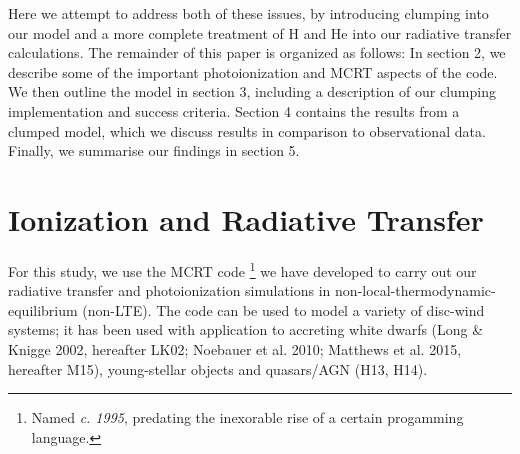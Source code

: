 \documentclass[useAMS,usenatbib]{mn2e_x}
\begin{document}
Here we attempt to address both of these issues, by introducing clumping into our model and a more complete treatment of H and He into our radiative transfer calculations.   The remainder of this paper is organized as follows:
In section 2, we describe some of the important photoionization 
and MCRT aspects of the code. We then outline the model in section 3, including 
a description of our clumping implementation and success criteria. 
Section 4 contains the results from a clumped model, which we discuss results
in comparison to observational data. Finally, we summarise our findings in section 5.





\section{Ionization and Radiative Transfer}

For this study, we use the MCRT code \py 
\footnote{Named {\sl c. 1995}, predating the inexorable rise of a certain progamming language.} we have developed to carry out our 
radiative transfer and photoionization simulations in non-local-thermodynamic-equilibrium 
(non-LTE). The code can be used to model a variety of
disc-wind systems; it has been used with application to accreting white dwarfs 
(Long \& Knigge 2002, hereafter LK02; Noebauer et al. 2010; 
Matthews et al. 2015, hereafter M15), young-stellar objects 
\citep{simmacro2005} and quasars/AGN (H13, H14).\nocite{noebauer, M15, LK02}  
\end{document}
